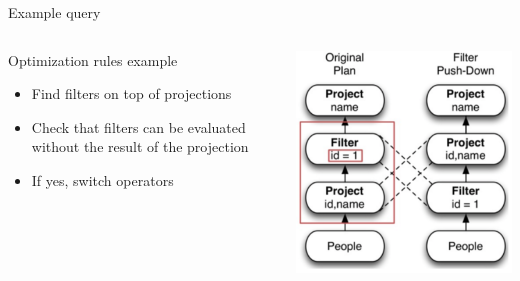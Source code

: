 \begin{frame}[fragile=singleslide]{Example query}
\begin{columns}

\begin{column}{0.5\textwidth}
Optimization rules example
\begin{itemize}
	\item Find filters on top of projections
	\item Check that filters can be evaluated without the result of the projection
	\item If yes, switch operators
\end{itemize}
\end{column}

\begin{column}{0.5\textwidth}
   	\begin{center}
     		\includegraphics[scale=0.4]{figures/ex-p3}
   	\end{center}
\end{column}
\end{columns}
\end{frame}

